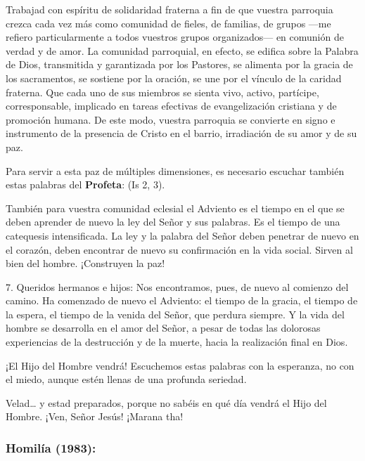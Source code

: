\begin{body}
					Trabajad con espíritu de solidaridad fraterna a fin de que vuestra parroquia crezca cada vez más como comunidad de fieles, de familias, de grupos ---me refiero particularmente a todos vuestros grupos organizados--- en comunión de verdad y de amor. La comunidad parroquial, en efecto, se edifica sobre la Palabra de Dios, transmitida y garantizada por los Pastores, se alimenta por la gracia de los sacramentos, se sostiene por la oración, se une por el vínculo de la caridad fraterna. Que cada uno de sus miembros se sienta vivo, activo, partícipe, corresponsable, implicado en tareas efectivas de evangelización cristiana y de promoción humana. De este modo, vuestra parroquia se convierte en signo e instrumento de la presencia de Cristo en el barrio, irradiación de su amor y de su paz. 
					
					Para servir a esta paz de múltiples dimensiones, es necesario escuchar también estas palabras del \textbf{Profeta}:  (Is 2, 3). 
					
					También para vuestra comunidad eclesial el Adviento es el tiempo en el que se deben aprender de nuevo la ley del Señor y sus palabras. Es el tiempo de una catequesis intensificada. La ley y la palabra del Señor deben penetrar de nuevo en el corazón, deben encontrar de nuevo su confirmación en la vida social. Sirven al bien del hombre. ¡Construyen la paz! 
					
					7. Queridos hermanos e hijos: Nos encontramos, pues, de nuevo al comienzo del camino. Ha comenzado de nuevo el Adviento: el tiempo de la gracia, el tiempo de la espera, el tiempo de la venida del Señor, que perdura siempre. Y la vida del hombre se desarrolla en el amor del Señor, a pesar de todas las dolorosas experiencias de la destrucción y de la muerte, hacia la realización final en Dios. 
					
					¡El Hijo del Hombre vendrá! Escuchemos estas palabras con la esperanza, no con el miedo, aunque estén llenas de una profunda seriedad. 
					
					Velad\ldots{} y estad preparados, porque no sabéis en qué día vendrá el Hijo del Hombre. ¡Ven, Señor Jesús! ¡Marana tha!
				\end{body}
				

			\subsubsection{Homilía (1983):}

